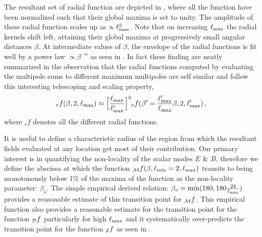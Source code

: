 The resultant set of radial function are depicted in , where all the function have been normalized such that their global maxima is set to unity. The amplitude of these radial function scales up as $\propto \ell_{\rm max}^2$. Note that on increasing $\ell_{\rm max}$ the radial kernels shift left, attaining their global maxima at progressively small angular distances $\beta$.  At intermediate values of $\beta$, the envelope of the radial functions is fit well by a power law $ \propto \beta^{-n}$ as seen in .
In fact these finding are neatly summarized in the observation that the radial functions computed by evaluating the multipole sums to different maximum multipoles are self similar and follow this interesting telescoping and scaling property, $${}_rf(\beta,2,\ell_{\rm max}) \approx \Big[\frac{\ell_{\rm max}}{\ell'_{\rm max}}\Big]^2{}_rf(\beta'=\frac{\ell'_{\rm max}}{\ell_{\rm max}} \beta ,2,\ell'_{\rm max}) \,,$$ where ${}_rf$ denotes all the different radial functions. 

It is useful to define a characteristic radius of the region from which the resultant fields evaluated at any location get most of their contribution.  Our primary interest is in quantifying the non-locality of the scalar modes $E$ \& $B$, therefore we define the abscissa at which the function ${_{\mathcal{M}}f}(\beta,\ell_{\rm min}=2,\ell_{\rm max})$ transits to being monotonously below 1\% of the maxima of the function as the non-locality parameter: $\beta_{o}$.
The simple empirical derived relation: $\beta_o= {\rm min}(180,180 \frac{24}{\ell_{\rm max}})$ provides a reasonable estimate of this transition point for  ${}_{\mathcal{M}}f$. This empirical function also provides a reasonable estimate for the transition point for the function ${}_{\mathcal{D}}f$ particularly for high $\ell_{\rm max}$ and it systematically over-predicts the transition point for the function ${}_{\mathcal{I}}f$ as seen in .